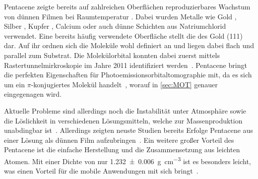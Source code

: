             Pentacene zeigte bereits auf zahlreichen Oberflächen reproduzierbares Wachstum von dünnen Filmen bei Raumtemperatur \cite{5A_9}.
            Dabei wurden Metalle wie Gold \cite{5A_6}, Silber \cite{5A_4}, Kupfer \cite{5A_1}, Calcium \cite{5A_5} oder auch dünne Schichten aus Natriumchlorid \cite{5A_10} verwendet.
            Eine bereits häufig verwendete Oberfläche stellt die des Gold (111) dar.
            Auf ihr ordnen sich die Moleküle wohl definiert an und liegen dabei flach und parallel zum Substrat.
            Die Molekülorbital konnten dabei zuerst mittels Rastertunnelmirkroskopie im Jahre 2011 identifiziert werden~\cite{5A_10}.
            Pentacene bringt die perfekten Eigenschaften für Photoemissionsorbitaltomographie mit, da es sich um ein $\pi$-konjugiertes Molekül handelt~\cite{MM_2}, worauf in \autoref{sec:MOT} genauer eingegenagen wird.

            Aktuelle Probleme sind allerdings noch die Instabilität unter Atmosphäre sowie die Löslichkeit in verschiedenen Lösungsmitteln, welche zur Massenproduktion unabdingbar ist~\cite{kus_chapter_2018}.
            Allerdings zeigten neuste Studien bereits Erfolge Pentacene aus einer Lösung als dünnen Film aufzubringen~\cite{5A_7}.
            Ein weitere großer Vorteil des Pentacene ist die einfache Herstellung \cite{kus_chapter_2018} und die Zusammensetzung aus leichten Atomen.
            Mit einer Dichte von nur \SI{1.232(6)}{\gram\per\cubic\centi\meter} ist es besonders leicht, was einen Vorteil für die mobile Anwendungen mit sich bringt~\cite{CAS}.
